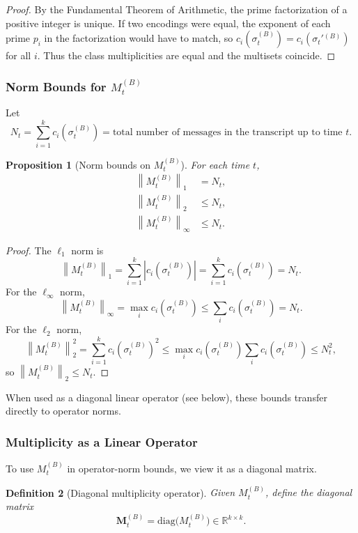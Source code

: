 \documentclass[11pt]{article}
\newtheorem{definition}{Definition}[section]
\newtheorem{proposition}[definition]{Proposition}
\newcommand{\R}{\mathbb{R}}
\newcommand{\norm}[1]{\left\lVert #1 \right\rVert}
\newcommand{\abs}[1]{\left\lvert #1 \right\rvert}
\begin{document}
\begin{proof}
By the Fundamental Theorem of Arithmetic, the prime factorization of a positive integer is unique.
If two encodings were equal, the exponent of each prime \(p_i\) in the factorization would have to match, so \(c_i(\sigma_t^{(B)}) = c_i(\sigma_t'{}^{(B)})\) for all \(i\).
Thus the class multiplicities are equal and the multisets coincide.
\end{proof}

\subsubsection{Norm Bounds for \texorpdfstring{$M_t^{(B)}$}{M\_t\^B}}

Let
\[
  N_t = \sum_{i=1}^k c_i(\sigma_t^{(B)}) = \text{total number of messages in the transcript up to time } t.
\]

\begin{proposition}[Norm bounds on \(M_t^{(B)}\)]
For each time \(t\),
\begin{align*}
  \norm{M_t^{(B)}}_1 &= N_t, \\
  \norm{M_t^{(B)}}_2 &\le N_t, \\
  \norm{M_t^{(B)}}_\infty &\le N_t.
\end{align*}
\end{proposition}

\begin{proof}
The \(\ell_1\) norm is
\[
  \norm{M_t^{(B)}}_1 = \sum_{i=1}^k \abs{c_i(\sigma_t^{(B)})} = \sum_{i=1}^k c_i(\sigma_t^{(B)}) = N_t.
\]
For the \(\ell_\infty\) norm,
\[
  \norm{M_t^{(B)}}_\infty = \max_i c_i(\sigma_t^{(B)}) \le \sum_i c_i(\sigma_t^{(B)}) = N_t.
\]
For the \(\ell_2\) norm,
\[
  \norm{M_t^{(B)}}_2^2 = \sum_{i=1}^k c_i(\sigma_t^{(B)})^2 \le \max_i c_i(\sigma_t^{(B)}) \sum_i c_i(\sigma_t^{(B)}) \le N_t^2,
\]
so \(\norm{M_t^{(B)}}_2 \le N_t\).
\end{proof}

When used as a diagonal linear operator (see below), these bounds transfer directly to operator norms.

\subsubsection{Multiplicity as a Linear Operator}

To use \(M_t^{(B)}\) in operator-norm bounds, we view it as a diagonal matrix.

\begin{definition}[Diagonal multiplicity operator]
Given \(M_t^{(B)}\), define the diagonal matrix
\[
  \mathbf{M}_t^{(B)} = \mathrm{diag}\bigl(M_t^{(B)}\bigr) \in \R^{k \times k}.
\]
\end{definition}
\end{document}
